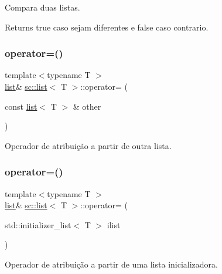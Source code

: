 Compara duas listas. \begin{DoxyReturn}{Returns}
true caso sejam diferentes e false caso contrario. 
\end{DoxyReturn}
\mbox{\label{classsc_1_1list_abc045e02a12cec8bf19c90c909b3a735}} 
\subsubsection{\texorpdfstring{operator=()}{operator=()}\hspace{0.1cm}{\footnotesize\ttfamily [1/2]}}
{\footnotesize\ttfamily template$<$typename T $>$ \\
\hyperlink{classsc_1_1list}{list}\& \hyperlink{classsc_1_1list}{sc\+::list}$<$ T $>$\+::operator= (\begin{DoxyParamCaption}\item[{const \hyperlink{classsc_1_1list}{list}$<$ T $>$ \&}]{other }\end{DoxyParamCaption})\hspace{0.3cm}{\ttfamily [inline]}}

Operador de atribuição a partir de outra lista. \mbox{\label{classsc_1_1list_a51c75e5f78c7bb99631e954bf5510918}} 
\subsubsection{\texorpdfstring{operator=()}{operator=()}\hspace{0.1cm}{\footnotesize\ttfamily [2/2]}}
{\footnotesize\ttfamily template$<$typename T $>$ \\
\hyperlink{classsc_1_1list}{list}\& \hyperlink{classsc_1_1list}{sc\+::list}$<$ T $>$\+::operator= (\begin{DoxyParamCaption}\item[{std\+::initializer\+\_\+list$<$ T $>$}]{ilist }\end{DoxyParamCaption})\hspace{0.3cm}{\ttfamily [inline]}}

Operador de atribuição a partir de uma lista inicializadora. \mbox{\label{classsc_1_1list_a6399b703b94a2940567cf6324928fc3b}} 
